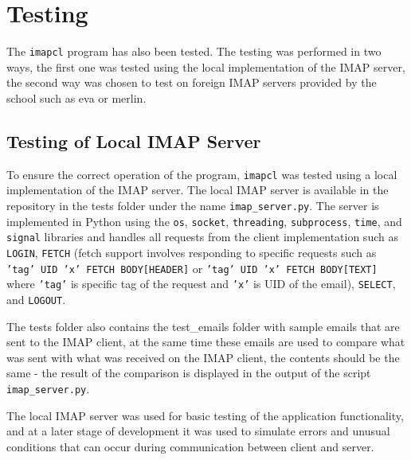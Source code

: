 \documentclass[a4paper,11pt]{article}
\begin{document}
\section{Testing}
The \verb!imapcl! program has also been tested. The testing was performed in two ways, 
the first one was tested using the local implementation of the IMAP server, the second 
way was chosen to test on foreign IMAP servers provided by the school such as eva or merlin.

\newpage

\subsection{Testing of Local IMAP Server}
To ensure the correct operation of the program, \texttt{imapcl} was tested using a local 
implementation of the IMAP server. The local IMAP server is available in the repository 
in the tests folder under the name \texttt{imap\_server.py}. The server is implemented in Python 
using the \texttt{os}, \texttt{socket}, \texttt{threading}, \texttt{subprocess}, 
\texttt{time}, and \texttt{signal} libraries and handles all requests from the client 
implementation such as \texttt{LOGIN}, \texttt{FETCH} (fetch support involves responding to 
specific requests such as \texttt{'tag' UID 'x' FETCH BODY[HEADER]} or \texttt{'tag' UID 'x' FETCH BODY[TEXT]} 
where \texttt{'tag'} is specific tag of the request and \texttt{'x'} is UID of the email), 
\texttt{SELECT}, and \texttt{LOGOUT}.

The tests folder also contains the test\_emails folder with sample emails that are sent to 
the IMAP client, at the same time these emails are used to compare what was sent with what 
was received on the IMAP client, the contents should be the same - the result of the 
comparison is displayed in the output of the script \texttt{imap\_server.py}.

The local IMAP server was used for basic testing of the application functionality, 
and at a later stage of development it was used to simulate errors and unusual conditions 
that can occur during communication between client and server.
\end{document}
